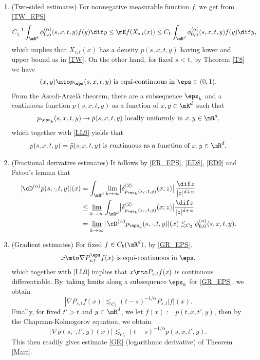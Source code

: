 \begin{enumerate}
\item
(Two-sided estimates) For nonnegative measurable function $f$, we get from \eqref{TW_EPS}
\begin{equation*}
C^{-1}_1\int_{\mR^d}\phi^{(\alpha)}_{0,\alpha}(s,x,t,y)f(y)\dif y\leq \mE f(X_{s,t}(x))\leq C_1\int_{\mR^d}\phi^{(\alpha)}_{0,\alpha}(s,x,t,y) f(y)\dif y,
\end{equation*}
which implies that $X_{s,t}(x)$ has a density $p(s,x,t,y)$ having lower and upper bound as in \eqref{TW}.
On the other hand, for fixed $s<t$, by Theorem \ref{T8} we have
\[
(x,y)\mto p_\eps(s,x,t,y) \text{ is equi-continuous in $\eps\in(0,1)$}.
\]
From the Ascoli-Arzelà theorem, there are a subsequence $\eps_k$ and a continuous function $\bar p(s,x,t,y)$ as a function of $x,y\in\mR^d$ such that
\begin{equation}\label{ED8}
p_{\eps_k}(s,x,t,y)\to \bar p(s,x,t,y) \text{ locally uniformly in $x,y\in\mR^d$},
\end{equation}
which together with \eqref{LL9} yields that
\begin{equation}\label{ED9}
p(s,x,t,y)=\bar p(s,x,t,y)\text{ is continuous as a function of $x,y\in\mR^d$.}
\end{equation}

\item
(Fractional derivative estimates)
It follows by \eqref{FR_EPS}, \eqref{ED8}, \eqref{ED9} and Fatou's lemma that
\begin{align*}
|\cD^{(\alpha)}{p(s,\cdot,t,y)}|(x)&=\int_{\mR^d}\lim_{k\to\infty}\bigl|\delta^{(2)}_{p_{\eps_k}(s,\cdot,t,y)}(x;z)\bigr|\,\frac{\dif z}{|z|^{d+\alpha}}\\
&\leq\varliminf_{k\to\infty}\int_{\mR^d}\bigl|\delta^{(2)}_{p_{\eps_k}(s,\cdot,t,y)}(x;z)\bigr|\frac{\dif z}{|z|^{d+\alpha}}\\
&=\varliminf_{k\to\infty}|\cD^{(\alpha)}{p_{\eps_k}(s,\cdot,t,y)}|(x)\lesssim_{C_2}\phi^{(\alpha)}_{0,0}(s,x,t,y).
\end{align*}

\item
(Gradient estimates) For fixed $f\in C_b(\mR^d)$, by \eqref{GR_EPS},
\[
x\mto\nabla P^\eps_{s,t}f(x) \text{ is equi-continuous in $\eps$},
\]
which together with \eqref{LL9} implies that $x\mto P_{s,t}f(x)$ is continuous differentiable.
By~taking limits along a subsequence $\eps_k$ for \eqref{GR_EPS}, we obtain
\[
|\nabla P_{s,t}f(x)|\lesssim_{C_3} (t-s)^{-1/\alpha}P_{s,t}|f|(x).
\]
Finally, for fixed $t'>t$ and $y\in\mR^d$, we let $f(x):=p(t,x,t',y)$, then by the Chapman-Kolmogorov equation, we obtain
\[
|\nabla p(s,\cdot,t',y)(x)|\lesssim_{C_3} (t-s)^{-1/\alpha}p(s,x,t',y).
\]
This then readily gives estimate \eqref{GR} (logarithmic derivative) of Theorem \ref{Main}.
\end{enumerate}

